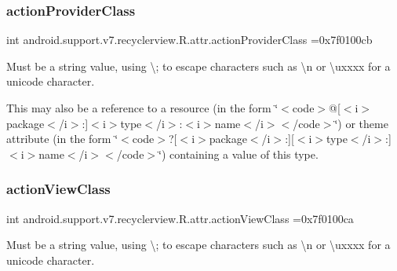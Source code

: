 \subsubsection{\texorpdfstring{action\+Provider\+Class}{actionProviderClass}}
{\footnotesize\ttfamily int android.\+support.\+v7.\+recyclerview.\+R.\+attr.\+action\+Provider\+Class =0x7f0100cb\hspace{0.3cm}{\ttfamily [static]}}

Must be a string value, using \textquotesingle{}\textbackslash{};\textquotesingle{} to escape characters such as \textquotesingle{}\textbackslash{}n\textquotesingle{} or \textquotesingle{}\textbackslash{}uxxxx\textquotesingle{} for a unicode character. 

This may also be a reference to a resource (in the form \char`\"{}$<$code$>$@\mbox{[}$<$i$>$package$<$/i$>$\+:\mbox{]}$<$i$>$type$<$/i$>$\+:$<$i$>$name$<$/i$>$$<$/code$>$\char`\"{}) or theme attribute (in the form \char`\"{}$<$code$>$?\mbox{[}$<$i$>$package$<$/i$>$\+:\mbox{]}\mbox{[}$<$i$>$type$<$/i$>$\+:\mbox{]}$<$i$>$name$<$/i$>$$<$/code$>$\char`\"{}) containing a value of this type. \mbox{\label{classandroid_1_1support_1_1v7_1_1recyclerview_1_1R_1_1attr_a167eab0bc64ada4fdc65480b13c3b790}} 
\subsubsection{\texorpdfstring{action\+View\+Class}{actionViewClass}}
{\footnotesize\ttfamily int android.\+support.\+v7.\+recyclerview.\+R.\+attr.\+action\+View\+Class =0x7f0100ca\hspace{0.3cm}{\ttfamily [static]}}

Must be a string value, using \textquotesingle{}\textbackslash{};\textquotesingle{} to escape characters such as \textquotesingle{}\textbackslash{}n\textquotesingle{} or \textquotesingle{}\textbackslash{}uxxxx\textquotesingle{} for a unicode character. 

